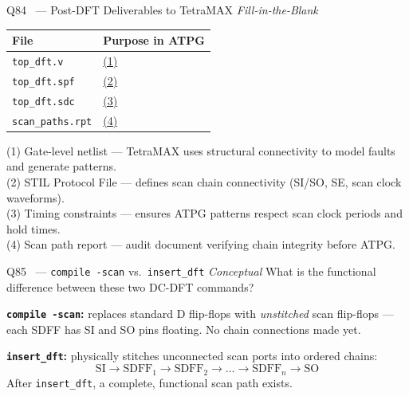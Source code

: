 \documentclass[12pt,a4paper]{article}
\newcommand{\advanced}{%
  \fbox{\textcolor{advred}{\bfseries\sffamily\small ADVANCED}}}
\newcommand{\moderate}{%
  \fbox{\textcolor{modoran}{\bfseries\sffamily\small MODERATE}}}
\begin{document}
\begin{questionbox}{Q84 \advanced\ --- Post-DFT Deliverables to TetraMAX \hfill\textit{Fill-in-the-Blank}}

\begin{center}
\begin{tabular}{|l|l|}
\hline
\rowcolor{dkblue!15}
\textbf{File} & \textbf{Purpose in ATPG}\\
\hline
\texttt{top\_dft.v} & \underline{(1)}\\
\hline
\texttt{top\_dft.spf} & \underline{(2)}\\
\hline
\texttt{top\_dft.sdc} & \underline{(3)}\\
\hline
\texttt{scan\_paths.rpt} & \underline{(4)}\\
\hline
\end{tabular}
\end{center}
\end{questionbox}

\begin{answerbox}
(1) Gate-level netlist --- TetraMAX uses structural connectivity to model faults and generate patterns.\\
(2) STIL Protocol File --- defines scan chain connectivity (SI/SO, SE, scan clock waveforms).\\
(3) Timing constraints --- ensures ATPG patterns respect scan clock periods and hold times.\\
(4) Scan path report --- audit document verifying chain integrity before ATPG.
\end{answerbox}

\begin{questionbox}{Q85 \moderate\ --- \texttt{compile -scan} vs.\ \texttt{insert\_dft} \hfill\textit{Conceptual}}
What is the functional difference between these two DC-DFT commands?
\end{questionbox}

\begin{answerbox}
\textbf{\texttt{compile -scan}:} replaces standard D flip-flops with \emph{unstitched} scan flip-flops --- each SDFF has SI and SO pins floating. No chain connections made yet.

\textbf{\texttt{insert\_dft}:} physically stitches unconnected scan ports into ordered chains:
\[ \text{SI} \to \text{SDFF}_1 \to \text{SDFF}_2 \to \ldots \to \text{SDFF}_n \to \text{SO} \]
After \texttt{insert\_dft}, a complete, functional scan path exists.
\end{answerbox}
\end{document}
